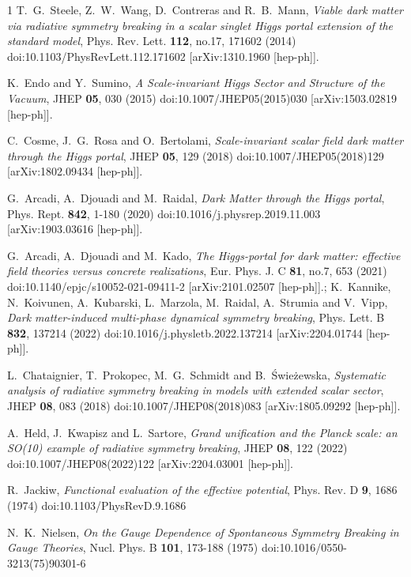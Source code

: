 \documentclass[11pt,a4paper,english,superscriptaddress,preprint,aps,prd]{revtex4}
\begin{document}
\begin{thebibliography}{1}
T.~G.~Steele, Z.~W.~Wang, D.~Contreras and R.~B.~Mann,
\textit{Viable dark matter via radiative symmetry breaking in a scalar singlet Higgs portal extension of the standard model},
Phys. Rev. Lett. \textbf{112}, no.17, 171602 (2014)
doi:10.1103/PhysRevLett.112.171602
[arXiv:1310.1960 [hep-ph]].

K.~Endo and Y.~Sumino,
\textit{A Scale-invariant Higgs Sector and Structure of the Vacuum},
JHEP \textbf{05}, 030 (2015)
doi:10.1007/JHEP05(2015)030
[arXiv:1503.02819 [hep-ph]].

C.~Cosme, J.~G.~Rosa and O.~Bertolami,
\textit{Scale-invariant scalar field dark matter through the Higgs portal},
JHEP \textbf{05}, 129 (2018)
doi:10.1007/JHEP05(2018)129
[arXiv:1802.09434 [hep-ph]].

G.~Arcadi, A.~Djouadi and M.~Raidal,
\textit{Dark Matter through the Higgs portal},
Phys. Rept. \textbf{842}, 1-180 (2020)
doi:10.1016/j.physrep.2019.11.003
[arXiv:1903.03616 [hep-ph]].

G.~Arcadi, A.~Djouadi and M.~Kado,
\textit{The Higgs-portal for dark matter: effective field theories versus concrete realizations},
Eur. Phys. J. C \textbf{81}, no.7, 653 (2021)
doi:10.1140/epjc/s10052-021-09411-2
[arXiv:2101.02507 [hep-ph]].; K.~Kannike, N.~Koivunen, A.~Kubarski, L.~Marzola, M.~Raidal, A.~Strumia and V.~Vipp,
\textit{Dark matter-induced multi-phase dynamical symmetry breaking},
Phys. Lett. B \textbf{832}, 137214 (2022)
doi:10.1016/j.physletb.2022.137214
[arXiv:2204.01744 [hep-ph]].

L.~Chataignier, T.~Prokopec, M.~G.~Schmidt and B.~\'Swie\.zewska,
\textit{Systematic analysis of radiative symmetry breaking in models with extended scalar sector},
JHEP \textbf{08}, 083 (2018)
doi:10.1007/JHEP08(2018)083
[arXiv:1805.09292 [hep-ph]].

A.~Held, J.~Kwapisz and L.~Sartore,
\textit{Grand unification and the Planck scale: an SO(10) example of radiative symmetry breaking},
JHEP \textbf{08}, 122 (2022)
doi:10.1007/JHEP08(2022)122
[arXiv:2204.03001 [hep-ph]].

R.~Jackiw,
\textit{Functional evaluation of the effective potential},
Phys. Rev. D \textbf{9}, 1686 (1974)
doi:10.1103/PhysRevD.9.1686

N.~K.~Nielsen,
\textit{On the Gauge Dependence of Spontaneous Symmetry Breaking in Gauge Theories},
Nucl. Phys. B \textbf{101}, 173-188 (1975)
doi:10.1016/0550-3213(75)90301-6


\end{thebibliography}
\end{document}
